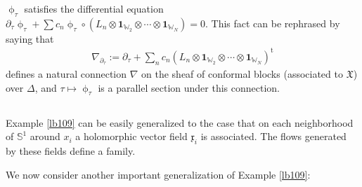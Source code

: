 \documentclass[12pt,a4paper,notitlepage]{article}
\theoremstyle{definition}
\theoremstyle{plain}
\newcommand{\fk}{\mathfrak}
\newcommand{\tr}{\mathrm{t}} %
\newcommand{\id}{\mathbf{1}}
\newcommand{\xk}{\mathfrak x}
\newcommand{\Wbb}{\mathbb W}
\newcommand{\Sbb}{{\mathbb S}}
\numberwithin{equation}{section}
\begin{document}
$\upphi_\tau$ satisfies the differential equation $\partial_\tau\upphi_\tau+\sum c_n\upphi_\tau\circ(L_n\otimes\id_{\Wbb_2}\otimes\cdots\otimes \id_{\Wbb_N})=0$. This fact can be rephrased by saying that
\begin{align}
\nabla_{\partial_\tau}:=\partial_\tau+\sum_n c_n (L_n\otimes\id_{\Wbb_2}\otimes\cdots\otimes \id_{\Wbb_N})^\tr
\end{align}
defines a natural connection $\nabla$  on the sheaf of conformal blocks (associated to $\fk X$) over $\Delta$, and $\tau\mapsto\upphi_\tau$ is a parallel section under this connection.




\subsection{}

Example \ref{lb109} can be easily generalized to the case that on each neighborhood of $\Sbb^1$ around $x_i$ a holomorphic vector field $\xk_i$ is associated. The flows generated by these fields define a family.

We now consider another important generalization of Example \ref{lb109}:
\end{document}

